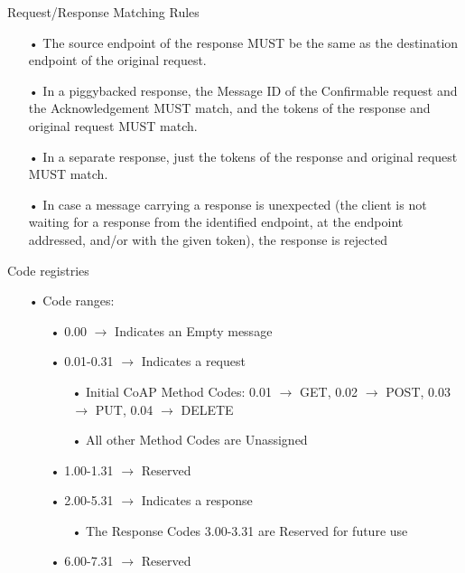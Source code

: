 \documentclass[11pt]{beamer}
\begin{document}
\begin{frame}{Request/Response Matching Rules}
\begin{itemize}
\item[•] The source endpoint of the response MUST be the same as the destination endpoint of the original request.
\item[•] In a piggybacked response, the Message ID of the Confirmable request and the Acknowledgement MUST match, and the tokens of the response and original request MUST match.  
\item[•] In a separate response, just the tokens of the response and original request MUST match.
\item[•] In case a message carrying a response is unexpected (the client is not waiting for a response from the identified endpoint, at the endpoint addressed, and/or with the given token), the response is rejected
\end{itemize}
\end{frame}
\begin{frame}{Code registries}
\begin{itemize}
\item[•] Code ranges:
\begin{itemize}
\item[•] 0.00 $\rightarrow$ Indicates an Empty message
\item[•] 0.01-0.31 $\rightarrow$ Indicates a request
\begin{itemize}
\item[•] Initial CoAP Method Codes: 0.01 $\rightarrow$ GET, 0.02 $\rightarrow$ POST, 0.03 $\rightarrow$ PUT, 0.04 $\rightarrow$ DELETE
\item[•] All other Method Codes are Unassigned
\end{itemize}
\item[•] 1.00-1.31 $\rightarrow$ Reserved
\item[•] 2.00-5.31 $\rightarrow$ Indicates a response
\begin{itemize}
\item[•] The Response Codes 3.00-3.31 are Reserved for future use
\end{itemize}
\item[•] 6.00-7.31 $\rightarrow$ Reserved
\end{itemize}
\end{itemize}
\end{frame}
\end{document}
